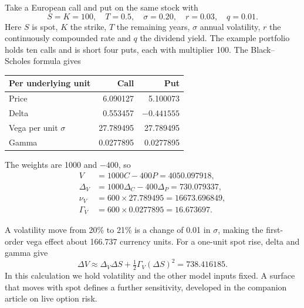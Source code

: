 \documentclass[8pt]{strategynet-journal}
\begin{document}
\begin{SNcolumns}
Take a European call and put on the same stock with
\[
 S=K=100,\quad T=0.5,\quad \sigma=0.20,\quad r=0.03,\quad q=0.01.
\]
Here $S$ is spot, $K$ the strike, $T$ the remaining years, $\sigma$ annual
volatility, $r$ the continuously compounded rate and $q$ the dividend yield.
The example portfolio holds ten calls and is short four puts, each with
multiplier 100. The Black--Scholes formula gives
\begin{center}
\begin{tabular}{@{}lrr@{}}
\toprule
Per underlying unit & Call & Put\\
\midrule
Price &6.090127&5.100073\\
Delta &0.553457&$-0.441555$\\
Vega per unit $\sigma$ &27.789495&27.789495\\
Gamma &0.0277895&0.0277895\\
\bottomrule
\end{tabular}
\end{center}
The weights are 1000 and $-400$, so
\begin{align*}
 V&=1000C-400P=4050.097918,\\
 \Delta_V&=1000\Delta_C-400\Delta_P=730.079337,\\
 \nu_V&=600\times27.789495=16673.696849,\\
 \Gamma_V&=600\times0.0277895=16.673697.
\end{align*}
\begin{center}
\begin{minipage}{\linewidth}
\centering
{}
\end{minipage}
\end{center}
A volatility move from 20\% to 21\% is a change of 0.01 in
$\sigma$, making the first-order vega effect about 166.737 currency units.
For a one-unit spot rise, delta and gamma give
\[
 \Delta V\approx\Delta_V\Delta S+\tfrac12\Gamma_V(\Delta S)^2
 =738.416185.
\]
In this calculation we hold volatility and the other model inputs fixed.
A surface that moves with spot defines a further sensitivity, developed in
the companion article on live option risk.


\end{SNcolumns}
\end{document}
